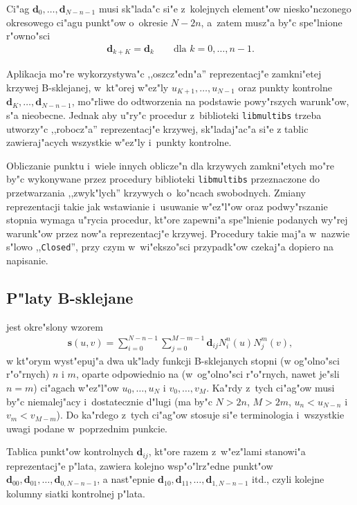 Ci"ag $\bm{d}_0,\ldots,\bm{d}_{N-n-1}$ musi sk"lada"c si"e
z~kolejnych element"ow niesko"nczonego okresowego ci"agu punkt"ow o~okresie
$N-2n$, a~zatem musz"a by"c spe"lnione r"owno"sci
\begin{align*}
  \bm{d}_{k+K} = \bm{d}_k\qquad\mbox{dla $k=0,\ldots,n-1$.}
\end{align*}

Aplikacja mo"re wykorzystywa"c ,,oszcz"edn"a'' reprezentacj"e zamkni"etej
krzywej B-sklejanej, w~kt"orej w"ez"ly $u_{K+1},\ldots,u_{N-1}$ oraz
punkty kontrolne $\bm{d}_{K},\ldots,\allowbreak\bm{d}_{N-n-1}$, mo"rliwe
do odtworzenia na podstawie powy"rszych warunk"ow, s"a nieobecne. Jednak aby
u"ry"c procedur z~biblioteki \texttt{libmultibs} trzeba utworzy"c
,,robocz"a'' reprezentacj"e krzywej, sk"ladaj"ac"a si"e z tablic
zawieraj"acych wszystkie w"ez"ly i~punkty kontrolne.

Obliczanie punktu i~wiele innych oblicze"n dla krzywych zamkni"etych mo"re
by"c wykonywane przez procedury biblioteki \texttt{libmultibs} przeznaczone
do przetwarzania ,,zwyk"lych'' krzywych o~ko"ncach swobodnych. Zmiany
reprezentacji takie jak wstawianie i~usuwanie w"ez"l"ow oraz podwy"rszanie
stopnia wymaga u"rycia procedur, kt"ore zapewni"a spe"lnienie podanych
wy"rej warunk"ow przez now"a reprezentacj"e krzywej. Procedury takie maj"a
w~nazwie s"lowo ,,\texttt{Closed}'', przy czym w~wi"ekszo"sci przypadk"ow
czekaj"a dopiero na napisanie.


\subsection{P"laty B-sklejane}

 jest okre"slony wzorem
\begin{align}\label{eq:BSpatch:def}
  \bm{s}(u,v) =
  \sum_{i=0}^{N-n-1}\sum_{j=0}^{M-m-1}\bm{d}_{ij}N^n_i(u) N^m_j(v),
\end{align}
w kt"orym wyst"epuj"a dwa uk"lady funkcji B-sklejanych stopni (w og"olno"sci
r"o"rnych) $n$ i $m$, oparte odpowiednio na (w~og"olno"sci r"o"rnych,
nawet je"sli $n=m$) ci"agach w"ez"l"ow $u_0,\ldots,u_N$ i $v_0,\ldots,v_M$.
Ka"rdy z~tych ci"ag"ow musi by"c niemalej"acy i~dostatecznie d"lugi (ma by"c
$N>2n$, $M>2m$, $u_n<u_{N-n}$ i~$v_m<v_{M-m}$). Do ka"rdego z~tych ci"ag"ow
stosuje si"e terminologia i~wszystkie uwagi podane w~poprzednim punkcie.

Tablica punkt"ow kontrolnych $\bm{d}_{ij}$, kt"ore razem z~w"ez"lami
stanowi"a reprezentacj"e p"lata, zawiera kolejno wsp"o"lrz"edne punkt"ow
$\bm{d}_{00},\bm{d}_{01},\ldots,\bm{d}_{0,N-n-1}$, a nast"epnie
$\bm{d}_{10},\bm{d}_{11},\ldots,\bm{d}_{1,N-n-1}$ itd., czyli kolejne
kolumny siatki kontrolnej p"lata.

